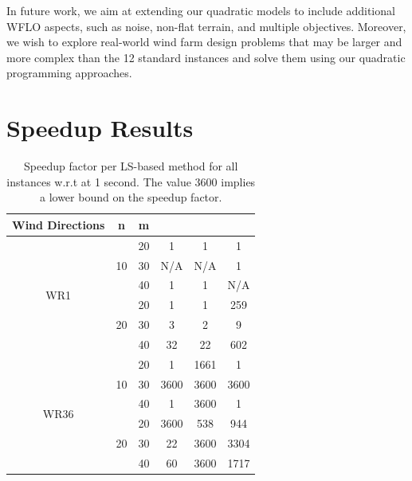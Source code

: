 \documentclass[preprint,12pt]{elsarticle}
\newcommand{\qcls}{{\sf {\small QC-LS\xspace}}}
\newcommand{\ilpls}{{\sf {\small ILP-LS\xspace}}}
\newcommand{\qulsgrb}{{\sf {\small QU-LS(GRB)\xspace}}}
\newcommand{\qulsda}{{\sf {\small QU-LS(DA)\xspace}}}
\begin{document}
In future work, we aim at extending our quadratic models to include additional 
WFLO aspects, such as noise, non-flat terrain, and multiple objectives. 
Moreover, we wish to explore real-world wind farm design problems 
that may be larger and more complex than the 12 standard instances 
and solve them 
using our quadratic programming approaches. 





%


\appendix

\section{Speedup Results}
\label{app1}



\begin{table}[t!]
	\small
	\begin{tabular}{| c | c | c | c | c | c | }
		\toprule
		Wind Directions  & n  & m  & \qcls &  \ilpls & \qulsgrb  \\
		\toprule
		\multirow{6}{*}{WR1}  & \multirow{3}{*}{10}  & 20 & 1       & 1 & 1  \\
		& & 30   & N/A & N/A & 1     \\
		& & 40 & 1 & 1 & N/A                \\
		\cline{2-6}
		&\multirow{3}{*}{20}   & 20  & 1  & 1  & 259         \\
		&&30   & 3 & 2  & 9    \\
		&&40   & 32 & 22  & 602        \\
		\hline
		\multirow{6}{*}{WR36} &  \multirow{3}{*}{10}    & 20 & 1       & 1661 & 1  \\
		&& 30  & 3600 & 3600 & 3600                     \\
		&&40   & 1 & 3600 & 1          \\
		\cline{2-6}
		&  \multirow{3}{*}{20}   & 20   & 3600  & 538 & 944            \\
		&&30   & 22 & 3600 & 3304                     \\
		&&40   & 60 & 3600 & 1717 \\
		\bottomrule                   
	\end{tabular}
	
	\vspace{0.5em}
	\caption{Speedup factor per LS-based method for all instances w.r.t \qulsda{} at 1 second. The value 3600 implies a lower bound on the speedup factor.}\label{tab:results3}
\end{table}
\end{document}
